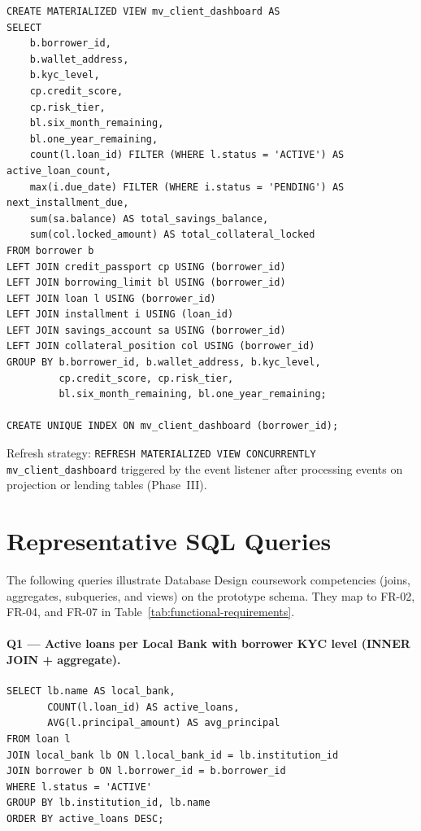 \documentclass[12pt,a4paper]{report}
\begin{document}
\begin{verbatim}
CREATE MATERIALIZED VIEW mv_client_dashboard AS
SELECT
    b.borrower_id,
    b.wallet_address,
    b.kyc_level,
    cp.credit_score,
    cp.risk_tier,
    bl.six_month_remaining,
    bl.one_year_remaining,
    count(l.loan_id) FILTER (WHERE l.status = 'ACTIVE') AS active_loan_count,
    max(i.due_date) FILTER (WHERE i.status = 'PENDING') AS next_installment_due,
    sum(sa.balance) AS total_savings_balance,
    sum(col.locked_amount) AS total_collateral_locked
FROM borrower b
LEFT JOIN credit_passport cp USING (borrower_id)
LEFT JOIN borrowing_limit bl USING (borrower_id)
LEFT JOIN loan l USING (borrower_id)
LEFT JOIN installment i USING (loan_id)
LEFT JOIN savings_account sa USING (borrower_id)
LEFT JOIN collateral_position col USING (borrower_id)
GROUP BY b.borrower_id, b.wallet_address, b.kyc_level,
         cp.credit_score, cp.risk_tier,
         bl.six_month_remaining, bl.one_year_remaining;

CREATE UNIQUE INDEX ON mv_client_dashboard (borrower_id);
\end{verbatim}

\noindent Refresh strategy: \texttt{REFRESH MATERIALIZED VIEW CONCURRENTLY mv\_client\_dashboard} triggered by the event listener after processing events on projection or lending tables (Phase~III).

\section{Representative SQL Queries}
\label{sec:sql-queries}

The following queries illustrate Database Design coursework competencies (joins, aggregates, subqueries, and views) on the prototype schema. They map to FR-02, FR-04, and FR-07 in Table~\ref{tab:functional-requirements}.

\paragraph{Q1 --- Active loans per Local Bank with borrower KYC level (INNER JOIN + aggregate).}
\begin{verbatim}
SELECT lb.name AS local_bank,
       COUNT(l.loan_id) AS active_loans,
       AVG(l.principal_amount) AS avg_principal
FROM loan l
JOIN local_bank lb ON l.local_bank_id = lb.institution_id
JOIN borrower b ON l.borrower_id = b.borrower_id
WHERE l.status = 'ACTIVE'
GROUP BY lb.institution_id, lb.name
ORDER BY active_loans DESC;
\end{verbatim}
\end{document}

